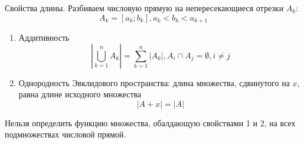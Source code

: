 Свойства длины. Разбиваем числовую прямую на непересекающиеся отрезки $A_k$:
        $$A_k=\left[a_k;b_k\right], a_k < b_k < a_{k+1}$$
\begin{enumerate}
    \item Аддитивность
        $$\left|\bigcup_{k=1}^n A_k\right|
        =\sum_{k=1}^n\left|A_k\right| , A_i\cap A_j=\emptyset, i\neq j$$
    \item Однородность Эвклидового пространства:
        длина множества, сдвинутого на $x$, равна длине исходного множества
        $$\left|A+x\right|=\left|A\right|$$
\end{enumerate}
\begin{affirmation}
    Нельзя определить функцию множества, обалдающую свойствами 1 и 2,
    на всех подмножествах числовой прямой.
\end{affirmation}
